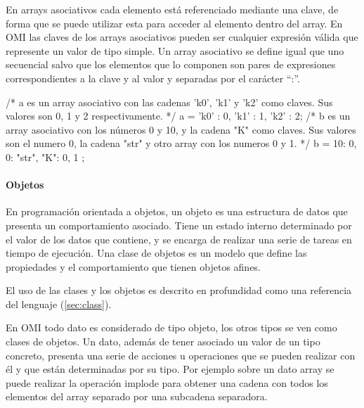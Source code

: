 En arrays asociativos cada elemento está referenciado mediante una clave, de forma que se puede utilizar esta para acceder al elemento dentro del array. En OMI las claves 
de los arrays asociativos pueden ser cualquier expresión válida que represente un valor de tipo simple. Un array asociativo se define igual que uno secuencial salvo que los elementos que lo
componen son pares de expresiones correspondientes a la clave y al valor y separadas por el carácter ``:''. \\

\begin{myverbatim}
   /*
      a es un array asociativo con las cadenas
      'k0', 'k1' y 'k2' como claves. Sus valores 
      son 0, 1 y 2 respectivamente.
   */
   a = {'k0' : 0, 'k1' : 1, 'k2' : 2};
   /* 
      b es un array asociativo con los números 0 y
      10, y la cadena "K" como claves. Sus valores son
      el numero 0, la cadena "str" y otro array con 
      los numeros 0 y 1.
   */
   b = { 10: 0, 0: "str", "K": { 0, 1 } }; 
\end{myverbatim}


\paragraph{Objetos} \label{sec:type_object}
En programación orientada a objetos, un objeto es una estructura de datos que presenta un comportamiento asociado. Tiene un estado interno 
determinado por el valor de los datos que contiene, y se encarga de realizar una serie de tareas en tiempo de ejecución. Una clase de objetos es un
modelo que define las propiedades y el comportamiento que tienen objetos afines. 

El uso de las clases y los objetos es descrito en profundidad como una referencia del lenguaje (\autoref{sec:class}).


En OMI todo dato es considerado de tipo objeto, los otros tipos se ven como clases de objetos. Un dato, además de tener asociado un valor de un tipo concreto, 
presenta  una serie de acciones u operaciones que se pueden realizar con él y que están determinadas por su tipo. Por ejemplo sobre un dato array se puede realizar la operación
implode para obtener una cadena con todos los elementos del array separado por una subcadena separadora. \\

